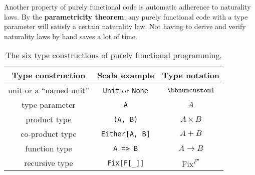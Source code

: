 Another property of purely functional code is automatic adherence
to naturality laws. By the \textbf{parametricity theorem},
any purely functional code with a type parameter will satisfy a certain
naturality law. Not having to derive and verify naturality laws by
hand saves a lot of time.

\begin{wraptable}{l}{0.58\columnwidth}%
\begin{centering}
\vspace{-0.2\baselineskip}
\begin{tabular}{|c|c|c|}
\hline 
\textbf{\small{}Type construction} & \textbf{\small{}Scala example} & \textbf{\small{}Type notation}\tabularnewline
\hline 
\hline 
{\small{}unit or a \textsf{``}named unit\textsf{''}} & {\small{}}\lstinline!Unit!{\small{} or }\lstinline!None!{\small{} } & {\small{}$\bbnum 1$}\tabularnewline
\hline 
{\small{}type parameter} & {\small{}}\lstinline!A! & {\small{}$A$}\tabularnewline
\hline 
{\small{}product type} & {\small{}}\lstinline!(A, B)! & {\small{}$A\times B$}\tabularnewline
\hline 
{\small{}co-product type} & {\small{}}\lstinline!Either[A, B]! & {\small{}$A+B$}\tabularnewline
\hline 
{\small{}function type} & {\small{}}\lstinline!A => B! & {\small{}$A\rightarrow B$}\tabularnewline
\hline 
{\small{}recursive type} & {\small{}}\lstinline!Fix[F[_]]! & {\small{}$\text{Fix}^{F^{\bullet}}$}\tabularnewline
\hline 
\end{tabular}
\par\end{centering}
\caption{The six type constructions
of purely functional programming.\label{tab:six-pure-type-constructions}}
\vspace{-0.2\baselineskip}
\end{wraptable}%

